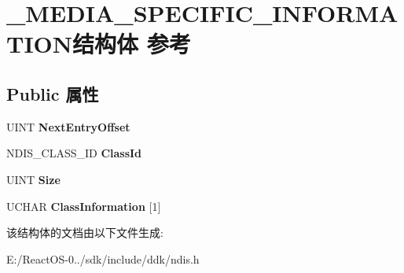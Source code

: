 \hypertarget{struct___m_e_d_i_a___s_p_e_c_i_f_i_c___i_n_f_o_r_m_a_t_i_o_n}{}\section{\+\_\+\+M\+E\+D\+I\+A\+\_\+\+S\+P\+E\+C\+I\+F\+I\+C\+\_\+\+I\+N\+F\+O\+R\+M\+A\+T\+I\+O\+N结构体 参考}
\label{struct___m_e_d_i_a___s_p_e_c_i_f_i_c___i_n_f_o_r_m_a_t_i_o_n}
\subsection*{Public 属性}
\begin{DoxyCompactItemize}
\item 
\mbox{\label{struct___m_e_d_i_a___s_p_e_c_i_f_i_c___i_n_f_o_r_m_a_t_i_o_n_a8726f47f34152aea6b9113cbe2d40319}} 
U\+I\+NT {\bfseries Next\+Entry\+Offset}
\item 
\mbox{\label{struct___m_e_d_i_a___s_p_e_c_i_f_i_c___i_n_f_o_r_m_a_t_i_o_n_a3b4b4bc82c9a362e98422018e1ee312c}} 
N\+D\+I\+S\+\_\+\+C\+L\+A\+S\+S\+\_\+\+ID {\bfseries Class\+Id}
\item 
\mbox{\label{struct___m_e_d_i_a___s_p_e_c_i_f_i_c___i_n_f_o_r_m_a_t_i_o_n_a4f541ad1ecd28ac9688620f91165916f}} 
U\+I\+NT {\bfseries Size}
\item 
\mbox{\label{struct___m_e_d_i_a___s_p_e_c_i_f_i_c___i_n_f_o_r_m_a_t_i_o_n_ac678ae25294b542a04e1d9eb5ab4b12a}} 
U\+C\+H\+AR {\bfseries Class\+Information} \mbox{[}1\mbox{]}
\end{DoxyCompactItemize}


该结构体的文档由以下文件生成\+:\begin{DoxyCompactItemize}
\item 
E\+:/\+React\+O\+S-\/0../sdk/include/ddk/ndis.\+h\end{DoxyCompactItemize}
